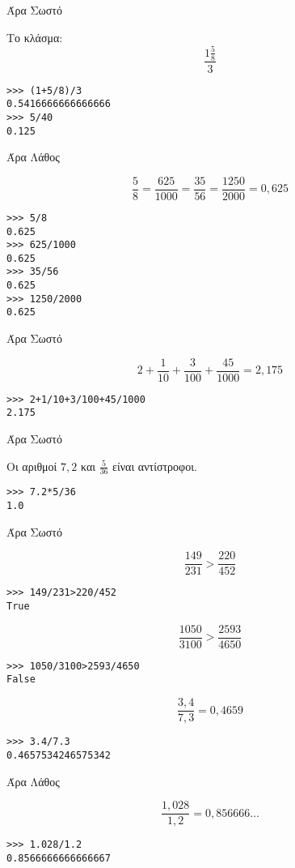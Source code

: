 Άρα Σωστό
\begin{exercise}
Το κλάσμα:
$$\frac{1\frac{5}{8}}{3}$$
\end{exercise}
\begin{lstlisting}
>>> (1+5/8)/3
0.5416666666666666
>>> 5/40
0.125
\end{lstlisting}
Άρα Λάθος
\begin{exercise}
$$\frac{5}{8}=\frac{625}{1000}=\frac{35}{56}=\frac{1250}{2000}=0,625$$
\end{exercise}
\begin{lstlisting}
>>> 5/8
0.625
>>> 625/1000
0.625
>>> 35/56
0.625
>>> 1250/2000
0.625
\end{lstlisting}
Άρα Σωστό
\begin{exercise}
$$2+\frac{1}{10}+\frac{3}{100}+\frac{45}{1000} = 2,175$$
\end{exercise}
\begin{lstlisting}
>>> 2+1/10+3/100+45/1000
2.175
\end{lstlisting}
Άρα Σωστό
\begin{exercise}
Οι αριθμοί $7,2$ και $\frac{5}{36}$ είναι αντίστροφοι.
\end{exercise}
\begin{lstlisting}
>>> 7.2*5/36
1.0
\end{lstlisting}
Άρα Σωστό
\begin{exercise}
$$\frac{149}{231}>\frac{220}{452}$$
\end{exercise}
\begin{lstlisting}
>>> 149/231>220/452
True
\end{lstlisting}
\begin{exercise}
$$\frac{1050}{3100}>\frac{2593}{4650}$$
\end{exercise}
\begin{lstlisting}
>>> 1050/3100>2593/4650
False
\end{lstlisting}
\begin{exercise}
$$\frac{3,4}{7,3} = 0,4659$$
\end{exercise}
\begin{lstlisting}
>>> 3.4/7.3
0.4657534246575342
\end{lstlisting}
Άρα Λάθος
\begin{exercise}
$$\frac{1,028}{1,2} = 0,856666\ldots$$
\end{exercise}
\begin{lstlisting}
>>> 1.028/1.2
0.8566666666666667
\end{lstlisting}
